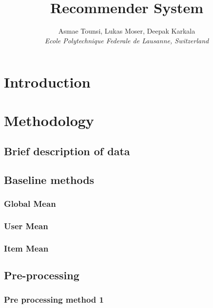 \documentclass[10pt,conference,compsocconf]{IEEEtran}
\begin{document}
\title{Recommender System}

\author{
   Asmae Tounsi, Lukas Moser, Deepak Karkala \\
  \textit{Ecole Polytechnique Federale de Lausanne, Switzerland}
}

\maketitle

\begin{abstract}
  
\end{abstract}

\section{Introduction}



\section{Methodology}
\label{sec:tips-writing}

\subsection{Brief description of data}


\subsection{Baseline methods}
\subsubsection{Global Mean}
\subsubsection{User Mean}
\subsubsection{Item Mean}

\subsection{Pre-processing}
\subsubsection{Pre processing method 1}
\end{document}
